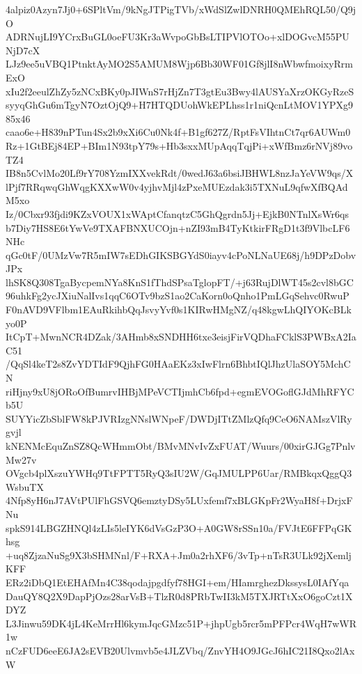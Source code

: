 4alpiz0Azyn7Jj0+6SPltVm/9kNgJTPigTVb/xWdSlZwlDNRH0QMEhRQL50/Q9jO
ADRNujLI9YCrxBuGL0oeFU3Kr3aWvpoGbBsLTIPVlOTOo+xlDOGvcM55PUNjD7cX
LJz9ee5uVBQ1PtnktAyMO2S5AMUM8Wjp6Bb30WF01Gf8jlI8nWbwfmoixyRrmExO
xIu2f2eeulZhZy5zNCxBKy0pJIWnS7rHjZn7T3gtEu3Bwy4lAUSYaXrzOKGyRzeS
syyqGhGu6mTgyN7OztOjQ9+H7HTQDUohWkEPLhss1r1niQcnLtMOV1YPXg985x46
caao6e+H839nPTun4Sx2b9xXi6Cu0Nk4f+B1gf627Z/RptFsVIhtnCt7qr6AUWm0
Rz+1GtBEj84EP+BIm1N93tpY79s+Hb3sxxMUpAqqTqjPi+xWfBmz6rNVj89voTZ4
IB8n5CvlMo20Lf9rY708YzmIXXvekRdt/0wedJ63a6bsiJBHWL8nzJaYeVW9qs/X
lPjf7RRqwqGhWqgKXXwW0v4yjhvMjl4zPxeMUEzdak3i5TXNuL9qfwXfBQAdM5xo
Iz/0Cbxr93fjdi9KZxVOUX1xWAptCfanqtzC5GhQgrdn5Jj+EjkB0NTnlXsWr6qs
b7Diy7HS8E6tYwVe9TXAFBNXUCOjn+nZI93mB4TyKtkirFRgD1t3f9VlbcLF6NHc
qGc0tF/0UMzVw7R5mIW7sEDhGIKSBGYdS0iayv4cPoNLNaUE68j/h9DPzDobvJPx
lhSK8Q308TgaBycpemNYa8KnS1fThdSPsaTglopFT/+j63RujDlWT45s2cvl8bGC
96uhkFg2ycJXiuNalIvs1qqC6OTv9bzS1ao2CaKorn0oQnho1PmLGqSehvc0RwuP
F0nAVD9VFlbm1EAuRkihbQqJsvyYvf0s1KIRwHMgNZ/q48kgwLhQIYOKcBLkyo0P
ItCpT+MwnNCR4DZak/3AHmb8xSNDHH6txe3eisjFirVQDhaFCklS3PWBxA2IaC51
/QqSl4keT2s8ZvYDTIdF9QjhFG0HAaEKz3xIwFlrn6BhbtIQlJhzUlaSOY5MchCN
riHjny9xU8jORoOfBumrvIHBjMPeVCTIjmhCb6fpd+egmEVOGoflGJdMhRFYCb5U
SUYYicZbSblFW8kPJVRIzgNNslWNpeF/DWDjITtZMlzQfq9CeO6NAMszVlRygvjl
kNENMcEquZnSZ8QcWHmmObt/BMvMNvIvZxFUAT/Wuurs/00xirGJGg7PnlvMw27v
OVgcb4plXszuYWHq9TtFPTT5RyQ3sIU2W/GqJMULPP6Uar/RMBkqxQggQ3WsbuTX
4Nfp8yH6nJ7AVtPUlFhGSVQ6emztyDSy5LUxfemf7xBLGKpFr2WyaH8f+DrjxFNu
spkS914LBGZHNQl4zLIs5leIYK6dVsGzP3O+A0GW8rSSn10a/FVJtE6FFPqGKhsg
+uq8ZjzaNuSg9X3bSHMNnl/F+RXA+Jm0a2rhXF6/3vTp+nTsR3ULk92jXemljKFF
ERz2iDbQ1EtEHAfMn4C38qodajpgdfyf78HGI+em/HIamrghezDkssysL0IAfYqa
DauQY8Q2X9DapPjOzs28arVsB+TlzR0d8PRbTwII3kM5TXJRTtXxO6goCzt1XDYZ
L3Jinwu59DK4jL4KeMrrHl6kymJqcGMzc51P+jhpUgb5rcr5mPFPcr4WqH7wWR1w
nCzFUD6eeE6JA2sEVB20Ulvmvb5e4JLZVbq/ZnvYH4O9JGcJ6hIC21I8Qxo2lAxW
